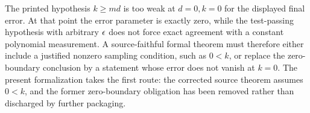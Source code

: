 \documentclass[11pt]{article}
\begin{document}
The printed hypothesis \(k\ge md\) is too weak at \(d=0,k=0\) for the displayed
final error.  At that point the error parameter is exactly zero, while the
test-passing hypothesis with arbitrary \(\epsilon\) does not force exact agreement
with a constant polynomial measurement.  A source-faithful formal theorem must
therefore either include a justified nonzero sampling condition, such as
\(0<k\), or replace the zero-boundary conclusion by a statement whose error
does not vanish at \(k=0\).  The present formalization takes the first route:
the corrected source theorem assumes \(0<k\), and the former zero-boundary
obligation has been removed rather than discharged by further packaging.



\end{document}
